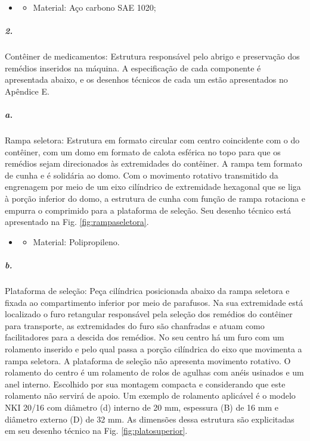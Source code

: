     \begin{itemize}
   \item[]
   \begin{itemize}
       \item Material: Aço carbono SAE 1020;
   \end{itemize}
   \end{itemize}
     


\subparagraph*{2.}
Contêiner de medicamentos: Estrutura responsável pelo abrigo e preservação dos remédios inseridos na máquina. A especificação de cada componente é apresentada abaixo, e os desenhos técnicos de cada um estão apresentados no Apêndice E.

    \subparagraph*{a.} \label{retorno_rampaseletora}
    Rampa seletora: Estrutura em formato circular com centro coincidente com o do contêiner, com um domo em formato de calota esférica no topo para que os remédios sejam direcionados às extremidades do contêiner. A rampa tem formato de cunha e é solidária ao domo. Com o movimento rotativo transmitido da engrenagem por meio de um eixo cilíndrico de extremidade hexagonal que se liga à porção inferior do domo, a estrutura de cunha com função de rampa rotaciona e empurra o comprimido para a plataforma de seleção.
    Seu desenho técnico está apresentado na Fig. \ref{fig:rampaseletora}.
    
    \begin{itemize}
   \item[]
   \begin{itemize}
       \item Material: Polipropileno.
   \end{itemize}
   \end{itemize}
     
    
    \subparagraph*{b.} \label{retorno_platosuperior}
    Plataforma de seleção: Peça cilíndrica posicionada abaixo da rampa seletora e fixada ao compartimento inferior por meio de parafusos. Na sua extremidade está localizado o furo retangular responsável pela seleção dos remédios do contêiner para transporte, as extremidades do furo são chanfradas e atuam como facilitadores para a descida dos remédios. No seu centro há um furo com um rolamento inserido e pelo qual passa a porção cilíndrica do eixo que movimenta a rampa seletora. A plataforma de seleção não apresenta movimento rotativo. 
    O rolamento do centro é um rolamento de rolos de agulhas com anéis usinados e um anel interno. Escolhido por sua montagem compacta e considerando que este rolamento não servirá de apoio. Um exemplo de rolamento aplicável é o modelo NKI 20/16 com diâmetro (d) interno de 20 mm, espessura (B) de 16 mm e diâmetro externo (D) de 32 mm.
    As dimensões dessa estrutura são explicitadas em seu desenho técnico na Fig. \ref{fig:platosuperior}.
    
